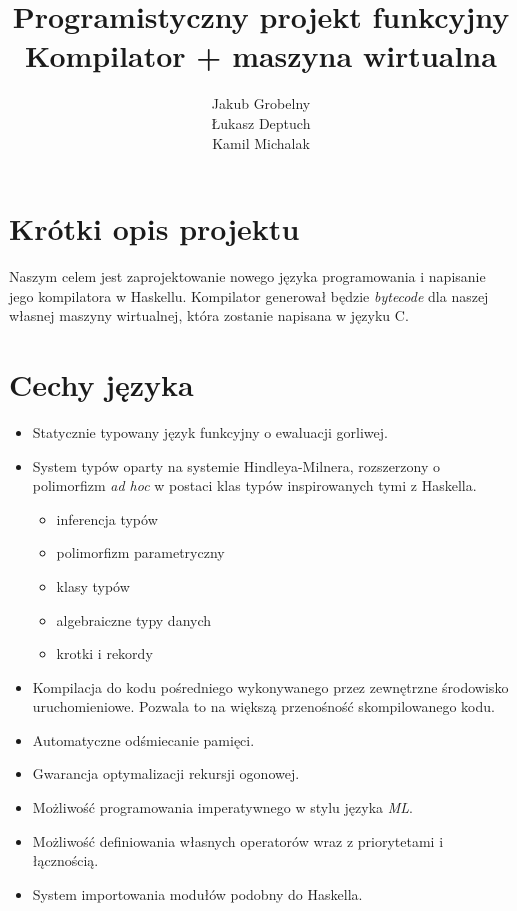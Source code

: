 \documentclass[12pt, a4paper, oneside]{report}
\title{\Huge Programistyczny projekt funkcyjny\\
       \Large Kompilator + maszyna wirtualna}
\author{Jakub Grobelny\\ Łukasz Deptuch\\ Kamil Michalak}
\date{}
\begin{document}
\begin{titlepage}
    \maketitle
    \thispagestyle{empty}
\end{titlepage}

\section*{Krótki opis projektu}
Naszym celem jest zaprojektowanie nowego języka programowania i napisanie 
jego kompilatora w Haskellu. Kompilator generował będzie \textit{bytecode} dla
naszej własnej maszyny wirtualnej, która zostanie napisana w języku C.

\section*{Cechy języka}
\begin{itemize}
    \item Statycznie typowany język funkcyjny o ewaluacji gorliwej.
    \item System typów oparty na systemie Hindleya-Milnera, rozszerzony o 
          polimorfizm \textit{ad hoc} w postaci klas typów inspirowanych 
          tymi z Haskella.
    \begin{itemize}
        \item inferencja typów
        \item polimorfizm parametryczny
        \item klasy typów
        \item algebraiczne typy danych
        \item krotki i rekordy
    \end{itemize}
    \item Kompilacja do kodu pośredniego wykonywanego przez zewnętrzne 
          środowisko uruchomieniowe. Pozwala to na większą przenośność
          skompilowanego kodu.
    \item Automatyczne odśmiecanie pamięci.
    \item Gwarancja optymalizacji rekursji ogonowej.
    \item Możliwość programowania imperatywnego w stylu języka \textit{ML}.
    \item Możliwość definiowania własnych operatorów wraz z priorytetami i 
          łącznością.
    \item System importowania modułów podobny do Haskella.
\end{itemize}
\end{document}
